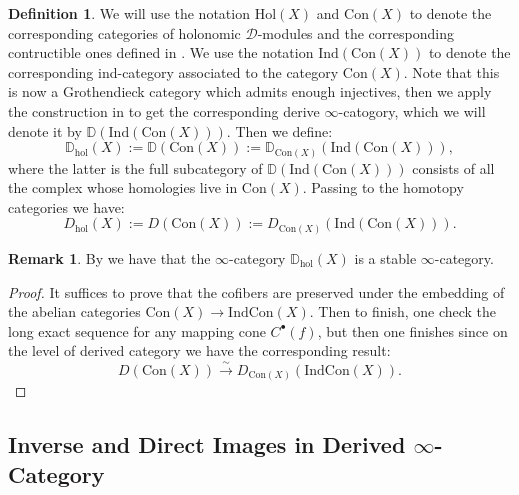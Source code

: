 \documentclass[11pt]{book}
\theoremstyle{definition}
\newtheorem{definition}[theorem]{Definition}
\newtheorem{remark}[theorem]{Remark}
\numberwithin{equation}{section}
\begin{document}
\begin{definition}
We will use the notation $\mathrm{Hol}(X)$ and $\mathrm{Con}(X)$ to denote the corresponding categories of holonomic $\mathcal{D}$-modules and the corresponding contructible ones defined in \cite[Definition after Proposition 1.3.3]{Abe1}. We use the notation $\mathrm{Ind}(\mathrm{Con}(X))$ to denote the corresponding ind-category associated to the category $\mathrm{Con}(X)$. Note that this is now a Grothendieck category which admits enough injectives, then we apply the construction in \cite[Section 1.3.2, Section 1.3.5]{Lurie2} to get the corresponding derive $\infty$-catogory, which we will denote it by $\mathbb{D}(\mathrm{Ind}(\mathrm{Con}(X)))$. Then we define:
\begin{displaymath}
\mathbb{D}_\mathrm{hol}(X):=\mathbb{D}(\mathrm{Con}(X)):=\mathbb{D}_{\mathrm{Con}(X)}(\mathrm{Ind}(\mathrm{Con}(X))),	
\end{displaymath}
where the latter is the full subcategory of $\mathbb{D}(\mathrm{Ind}(\mathrm{Con}(X)))$ consists of all the complex whose homologies live in $\mathrm{Con}(X)$. Passing to the homotopy categories we have:
\begin{displaymath}
D_\mathrm{hol}(X):=D(\mathrm{Con}(X)):=D_{\mathrm{Con}(X)}(\mathrm{Ind}(\mathrm{Con}(X))).	
\end{displaymath}

\end{definition}


\begin{remark}
By \cite[Section 1.3]{Lurie2} we have that the $\infty$-category $\mathbb{D}_\mathrm{hol}(X)$ is a stable $\infty$-category.	
\end{remark}


\begin{proof}
It suffices to prove that the cofibers are preserved under the embedding of the abelian categories $\mathrm{Con}(X)\rightarrow \mathrm{Ind}\mathrm{Con}(X)$. Then to finish, one check the long exact sequence for any mapping cone $C^\bullet(f)$, but then one finishes since on the level of derived category we have the corresponding result:
\begin{displaymath}
D(\mathrm{Con}(X))\overset{\sim}{\rightarrow}D_{\mathrm{Con}(X)}(\mathrm{Ind}\mathrm{Con}(X)).
\end{displaymath}	
\end{proof}




\subsection{Inverse and Direct Images in Derived $\infty$-Category}
\end{document}
